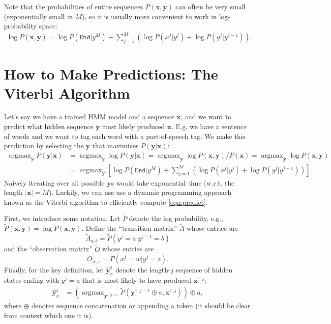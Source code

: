 \documentclass{article}
\DeclareMathOperator{\argmax}{argmax}
\newcommand{\Yh}{\hat{\textbf{y}}}
\newcommand{\Pt}{\tilde{P}}
\newcommand{\At}{\tilde{A}}
\newcommand{\Ot}{\tilde{O}}
\newcommand{\x}{\textbf{x}}
\newcommand{\y}{\textbf{y}}
\newcommand{\END}{\texttt{End}}
\begin{document}
Note that the probabilities of entire sequences $P(\x,\y)$ can often be very small (exponentially small in $M$), so it is usually more convenient to work in log-probability space:
\begin{eqnarray}\log P(\x,\y) = \log P(\END|y^M)+\sum_{j=1}^M\left(\log P(x^j|y^j) + \log P(y^j|y^{j-1})\right).\label{eqn:log_hmm}\end{eqnarray}


\section{How to Make Predictions: The Viterbi Algorithm}

Let's say we have a trained HMM model and a sequence $\x$, and we want to predict what hidden sequence $\y$ most likely produced $\x$.  E.g. we have a sentence of words and we want to tag each word with a part-of-speech tag.  We make this prediction by selecting the $\y$ that maximizes $P(\y|\x)$:
\begin{align}\argmax_{\y} P(\y|\x)& = \argmax_\y \log P(\y|\x) =\argmax_\y \log P(\x,\y)/P(\x) =\argmax_\y \log P(\x,\y) \nonumber\\
      &= \argmax_\y \left[\log P(\END|y^M) + \sum_{j=1}^M \left( \log P(x^j|y^j) + \log P(y^j|y^{j-1})\right)\right].\label{eqn:predict}\end{align}
Naively iterating over all possible $\y$s would take exponential time (w.r.t. the length $|\x|=M$).  Luckily, we can use use a dynamic programming approach known as the Viterbi algorithm to efficiently compute \eqref{eqn:predict}.

First, we introduce some notation. Let $\Pt$ denote the log probability, e.g., $\Pt(\x,\y) = \log P(\x,\y)$. Define the ``transition matrix'' $\At$ whose entries are \[\At_{a,b} = \Pt(y^j=a|y^{j-1}=b)\] and the ``observation matrix'' $\Ot$ whose entries are \[\Ot_{w,z} = \Pt(x^j=w|y^j=z).\]
Finally, for the key definition, let $\Yh^j_a$ denote the length-$j$ sequence of hidden states ending with $y^j=a$ that is most likely to have produced $\x^{1:j}$:  
\begin{align}
\Yh^j_a &= \left(\argmax_{\y^{1:j-1}} \Pt(\y^{1:j-1} \oplus a, \x^{1:j})\right) \oplus a,\label{eqn:Yh}\end{align}
where $\oplus$ denotes sequence concatenation or appending a token (it should be clear from context which one it is).
\end{document}
